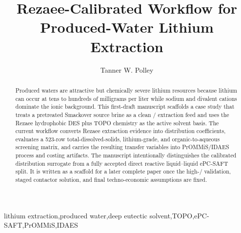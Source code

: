 \documentclass[a4paper,fleqn]{styles/cas-sc}
\newcommand{\LiIon}{\ce{Li+}\xspace}
\newcommand{\NaIon}{\ce{Na+}\xspace}
\newcommand{\DES}{DES\xspace}
\newcommand{\TOPO}{TOPO\xspace}
\newcommand{\Smackover}{Smackover\xspace}
\newcommand{\Prommis}{PrOMMiS\xspace}
\newcommand{\IDAES}{IDAES\xspace}
\begin{document}
\let\WriteBookmarks\relax
\def\floatpagepagefraction{1}
\def\textpagefraction{.001}


\title[mode=title]{Rezaee-Calibrated Workflow for Produced-Water Lithium Extraction}

\author[1]{Tanner W. Polley}

\begin{abstract}
Produced waters are attractive but chemically severe lithium resources because lithium can occur at tens to hundreds of milligrams per liter while sodium and divalent cations dominate the ionic background. This first-draft manuscript scaffolds a case study that treats a pretreated \Smackover source brine as a clean \LiIon/\NaIon extraction feed and uses the Rezaee hydrophobic \DES plus \TOPO chemistry as the active solvent basis. The current workflow converts Rezaee extraction evidence into distribution coefficients, evaluates a 523-row total-dissolved-solids, lithium-grade, and organic-to-aqueous screening matrix, and carries the resulting transfer variables into \Prommis/\IDAES process and costing artifacts. The manuscript intentionally distinguishes the calibrated distribution surrogate from a fully accepted direct reactive liquid--liquid ePC-SAFT split. It is written as a scaffold for a later complete paper once the high-\NaIon/\LiIon validation, staged contactor solution, and final techno-economic assumptions are fixed.
\end{abstract}

\begin{keywords}
lithium extraction\sep{}produced water\sep{}deep eutectic solvent\sep{}TOPO\sep{}ePC-SAFT\sep{}PrOMMiS\sep{}IDAES
\end{keywords}

\maketitle








\clearpage


\end{document}
